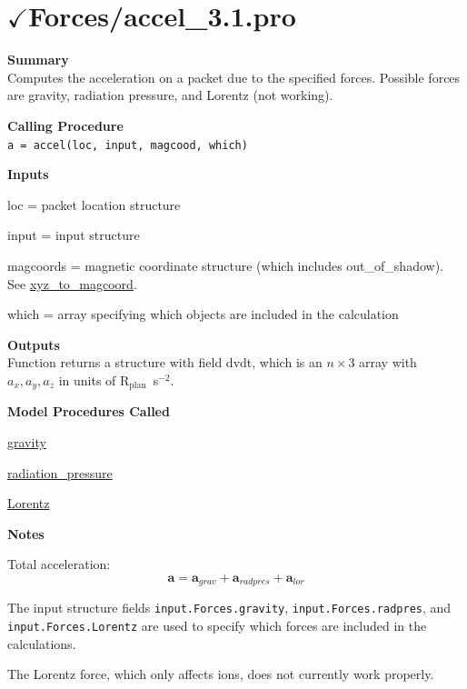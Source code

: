 \documentclass[11pt]{article}
\newcommand\descrip[1]{\textsf{\textbf{\large{#1}}}\\}
\newcommand\Rplan{R$_{\mathrm{plan}}$}
\begin{document}
\clearpage

\section{$\checkmark$Forces/accel\_3.1.pro} \label{sec:accel}

\descrip{Summary}
Computes the acceleration on a packet due to the specified forces. Possible
forces are gravity, radiation pressure, and Lorentz (not working). 

\descrip{Calling Procedure}
\verb+a = accel(loc, input, magcood, which)+

\descrip{Inputs}
\begin{compactenum} \listup
\item loc = packet location structure
\item input = input structure
\item magcoords = magnetic coordinate structure (which includes
out\_of\_shadow). See \hyperref[sec:xyz_to_magcood]{xyz\_to\_magcoord}.
\item which = array specifying which objects are included in the calculation
\end{compactenum}

\descrip{Outputs}
Function returns a structure with field dvdt, which is an $n\times 3$ array
with $a_x, a_y, a_z$ in units of \Rplan\ s$^{-2}$.

\descrip{Model Procedures Called}
\begin{compactenum} \listup
\item \hyperref[sec:gravity]{gravity}
\item \hyperref[sec:radiation_pressure]{radiation\_pressure}
\item \hyperref[sec:lorentz]{Lorentz}
\end{compactenum}

\descrip{Notes}
\begin{compactenum} \listup
\item Total acceleration:
\begin{equation}
\mathbf{a} = \mathbf{a}_{grav} + \mathbf{a}_{radpres} + \mathbf{a}_{lor}
\end{equation}
\item The input structure fields \texttt{input.Forces.gravity},
\texttt{input.Forces.radpres}, and \texttt{input.Forces.Lorentz} are used to
specify which forces are included in the calculations.
\item The Lorentz force, which only affects ions, does not currently work
properly.
\end{compactenum}
\end{document}
